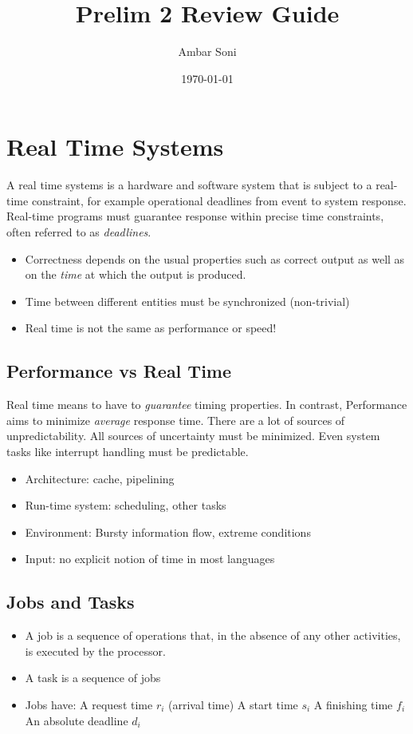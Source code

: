 \documentclass{hw}
\title{Prelim 2 Review Guide}     %
\author{Ambar Soni}               %
\date{\today}                     %
\begin{document}
\maketitle
\tableofcontents

\section{Real Time Systems}
A real time systems is a hardware and software system that is subject to a 
real-time constraint, for example operational deadlines from event to system 
response. Real-time programs must guarantee response within precise time 
constraints, often referred to as \emph{deadlines}.
\begin{itemize}
  \item Correctness depends on  the usual properties such as correct output as
    well as on the \emph{time} at which the output is produced.
  \item Time between different entities must be synchronized (non-trivial)
  \item Real time is not the same as performance or speed!
\end{itemize}

\subsection{Performance vs Real Time}
Real time means to have to \emph{guarantee} timing properties. In contrast, 
Performance aims to minimize \emph{average} response time. There are a lot
of sources of unpredictability. All sources of uncertainty must be minimized. 
Even system tasks like interrupt handling must be predictable. 
\begin{itemize}
  \item Architecture: cache, pipelining
  \item Run-time system: scheduling, other tasks
  \item Environment: Bursty information flow, extreme conditions
  \item Input: no explicit notion of time in most languages
\end{itemize}

\subsection{Jobs and Tasks}
\begin{itemize}
  \item A job is a sequence of operations that, in the absence of any other
    activities, is executed by the processor.
  \item A task is a sequence of jobs
  \item Jobs have:
    \subitem A request time $r_{i}$ (arrival time)
    \subitem A start time $s_{i}$
    \subitem A finishing time $f_{i}$
    \subitem An absolute deadline $d_{i}$
\end{itemize}
\end{document}
